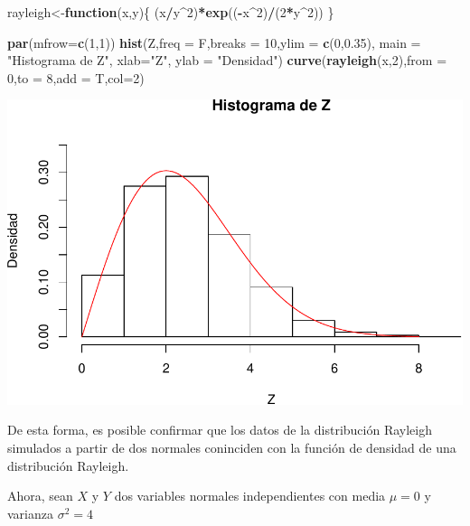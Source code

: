\documentclass[]{article}
\newenvironment{Shaded}{\begin{snugshade}}{\end{snugshade}}
\newcommand{\KeywordTok}[1]{\textcolor[rgb]{0.13,0.29,0.53}{\textbf{#1}}}
\newcommand{\DataTypeTok}[1]{\textcolor[rgb]{0.13,0.29,0.53}{#1}}
\newcommand{\DecValTok}[1]{\textcolor[rgb]{0.00,0.00,0.81}{#1}}
\newcommand{\FloatTok}[1]{\textcolor[rgb]{0.00,0.00,0.81}{#1}}
\newcommand{\StringTok}[1]{\textcolor[rgb]{0.31,0.60,0.02}{#1}}
\newcommand{\ControlFlowTok}[1]{\textcolor[rgb]{0.13,0.29,0.53}{\textbf{#1}}}
\newcommand{\OperatorTok}[1]{\textcolor[rgb]{0.81,0.36,0.00}{\textbf{#1}}}
\newcommand{\NormalTok}[1]{#1}
\begin{document}
\begin{Shaded}
\begin{Highlighting}[]
\NormalTok{rayleigh<-}\ControlFlowTok{function}\NormalTok{(x,y)\{}
\NormalTok{  (x}\OperatorTok{/}\NormalTok{y}\OperatorTok{^}\DecValTok{2}\NormalTok{)}\OperatorTok{*}\KeywordTok{exp}\NormalTok{((}\OperatorTok{-}\NormalTok{x}\OperatorTok{^}\DecValTok{2}\NormalTok{)}\OperatorTok{/}\NormalTok{(}\DecValTok{2}\OperatorTok{*}\NormalTok{y}\OperatorTok{^}\DecValTok{2}\NormalTok{))}
\NormalTok{\}}

\KeywordTok{par}\NormalTok{(}\DataTypeTok{mfrow=}\KeywordTok{c}\NormalTok{(}\DecValTok{1}\NormalTok{,}\DecValTok{1}\NormalTok{))}
\KeywordTok{hist}\NormalTok{(Z,}\DataTypeTok{freq =}\NormalTok{ F,}\DataTypeTok{breaks =} \DecValTok{10}\NormalTok{,}\DataTypeTok{ylim =} \KeywordTok{c}\NormalTok{(}\DecValTok{0}\NormalTok{,}\FloatTok{0.35}\NormalTok{), }
     \DataTypeTok{main =} \StringTok{"Histograma de Z"}\NormalTok{, }\DataTypeTok{xlab=}\StringTok{"Z"}\NormalTok{, }\DataTypeTok{ylab =} \StringTok{"Densidad"}\NormalTok{)}
\KeywordTok{curve}\NormalTok{(}\KeywordTok{rayleigh}\NormalTok{(x,}\DecValTok{2}\NormalTok{),}\DataTypeTok{from =} \DecValTok{0}\NormalTok{,}\DataTypeTok{to =} \DecValTok{8}\NormalTok{,}\DataTypeTok{add =}\NormalTok{ T,}\DataTypeTok{col=}\DecValTok{2}\NormalTok{)}
\end{Highlighting}
\end{Shaded}

\includegraphics[width=0.75\linewidth]{notebook_simulaciones_files/figure-latex/unnamed-chunk-5-1}

De esta forma, es posible confirmar que los datos de la distribución
Rayleigh simulados a partir de dos normales coninciden con la función de
densidad de una distribución Rayleigh.

Ahora, sean \(X\) y \(Y\) dos variables normales independientes con
media \(\mu=0\) y varianza \(\sigma^2=4\)
\end{document}

